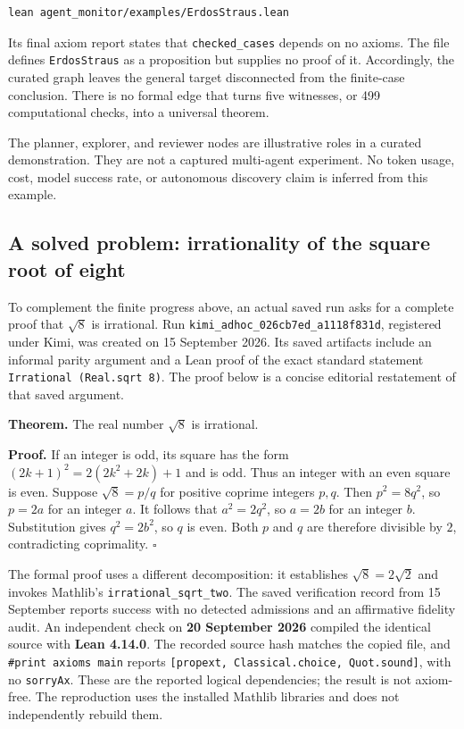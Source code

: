 \documentclass[10pt,letterpaper]{article}
\begin{document}
\begin{lstlisting}
lean agent_monitor/examples/ErdosStraus.lean
\end{lstlisting}

Its final axiom report states that \nolinkurl{checked_cases} depends on no axioms. The file defines \nolinkurl{ErdosStraus} as a proposition but supplies no proof of it. Accordingly, the curated graph leaves the general target disconnected from the finite-case conclusion. There is no formal edge that turns five witnesses, or 499 computational checks, into a universal theorem.

The planner, explorer, and reviewer nodes are illustrative roles in a curated demonstration. They are not a captured multi-agent experiment. No token usage, cost, model success rate, or autonomous discovery claim is inferred from this example.

\subsection{A solved problem: irrationality of the square root of eight}

To complement the finite progress above, an actual saved run asks for a complete proof that $\sqrt{8}$ is irrational. Run \nolinkurl{kimi_adhoc_026cb7ed_a1118f831d}, registered under Kimi, was created on 15 September 2026. Its saved artifacts include an informal parity argument and a Lean proof of the exact standard statement \texttt{Irrational (Real.sqrt 8)}. The proof below is a concise editorial restatement of that saved argument.

\textbf{Theorem.} The real number $\sqrt{8}$ is irrational.

\textbf{Proof.} If an integer is odd, its square has the form $(2k+1)^2=2(2k^2+2k)+1$ and is odd. Thus an integer with an even square is even. Suppose $\sqrt{8}=p/q$ for positive coprime integers $p,q$. Then $p^2=8q^2$, so $p=2a$ for an integer $a$. It follows that $a^2=2q^2$, so $a=2b$ for an integer $b$. Substitution gives $q^2=2b^2$, so $q$ is even. Both $p$ and $q$ are therefore divisible by $2$, contradicting coprimality. $\square$

The formal proof uses a different decomposition: it establishes $\sqrt{8}=2\sqrt{2}$ and invokes Mathlib's \nolinkurl{irrational_sqrt_two}. The saved verification record from 15 September reports success with no detected admissions and an affirmative fidelity audit. An independent check on \textbf{20 September 2026} compiled the identical source with \textbf{Lean 4.14.0}. The recorded source hash matches the copied file, and \texttt{\#print axioms main} reports \texttt{[propext, Classical.choice, Quot.sound]}, with no \nolinkurl{sorryAx}. These are the reported logical dependencies; the result is not axiom-free. The reproduction uses the installed Mathlib libraries and does not independently rebuild them.
\end{document}
